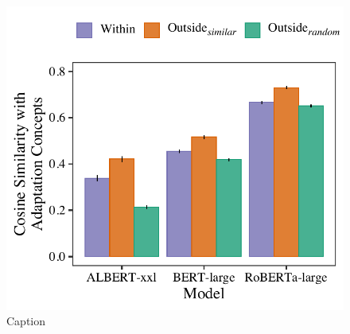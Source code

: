 \documentclass[10pt,letterpaper]{article}
\begin{document}
\begin{figure}
    \centering
    \includegraphics[width=\columnwidth]{cosine.pdf}
    \caption{Caption}
    \label{fig:cosine}
\end{figure}
\end{document}
